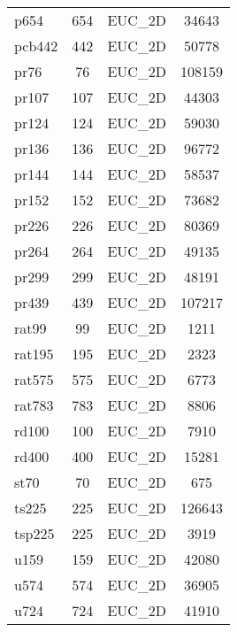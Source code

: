 \begin{tabularx}{\textwidth}{lccc}
    p654 & 654 & EUC\_2D & 34643 \\
    pcb442 & 442 & EUC\_2D & 50778 \\
    pr76 & 76 & EUC\_2D & 108159 \\
    pr107 & 107 & EUC\_2D & 44303 \\
    pr124 & 124 & EUC\_2D & 59030 \\
    pr136 & 136 & EUC\_2D & 96772 \\
    pr144 & 144 & EUC\_2D & 58537 \\
    pr152 & 152 & EUC\_2D & 73682 \\
    pr226 & 226 & EUC\_2D & 80369 \\
    pr264 & 264 & EUC\_2D & 49135 \\
    pr299 & 299 & EUC\_2D & 48191 \\
    pr439 & 439 & EUC\_2D & 107217 \\
    rat99 & 99 & EUC\_2D & 1211 \\
    rat195 & 195 & EUC\_2D & 2323 \\
    rat575 & 575 & EUC\_2D & 6773 \\
    rat783 & 783 & EUC\_2D & 8806 \\
    rd100 & 100 & EUC\_2D & 7910 \\
    rd400 & 400 & EUC\_2D & 15281 \\
    st70 & 70 & EUC\_2D & 675 \\
    ts225 & 225 & EUC\_2D & 126643 \\
    tsp225 & 225 & EUC\_2D & 3919 \\
    u159 & 159 & EUC\_2D & 42080 \\
    u574 & 574 & EUC\_2D & 36905 \\
    u724 & 724 & EUC\_2D & 41910 \\
\end{tabularx}
